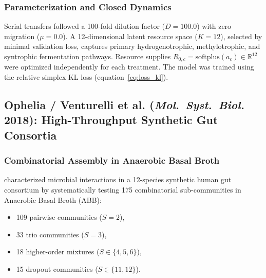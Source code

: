 \subsubsection{Parameterization and Closed Dynamics}
Serial transfers followed a 100-fold dilution factor ($D = 100.0$) with zero migration ($\mu = 0.0$). A 12-dimensional latent resource space ($K = 12$), selected by minimal validation loss, captures primary hydrogenotrophic, methylotrophic, and syntrophic fermentation pathways. Resource supplies $R_{0, c} = \text{softplus}(a_c) \in \mathbb{R}^{12}$ were optimized independently for each treatment. The model was trained using the relative simplex KL loss (equation~\eqref{eq:loss_kl}).

\subsection{Ophelia / Venturelli et al. (\textit{Mol.\ Syst.\ Biol.} 2018): High-Throughput Synthetic Gut Consortia}
\subsubsection{Combinatorial Assembly in Anaerobic Basal Broth}
\citet{venturelli2018deciphering} characterized microbial interactions in a 12-species synthetic human gut consortium by systematically testing 175 combinatorial sub-communities in Anaerobic Basal Broth (ABB):
\begin{itemize}
    \item 109 pairwise communities ($S = 2$),
    \item 33 trio communities ($S = 3$),
    \item 18 higher-order mixtures ($S \in \{4, 5, 6\}$),
    \item 15 dropout communities ($S \in \{11, 12\}$).
\end{itemize}

